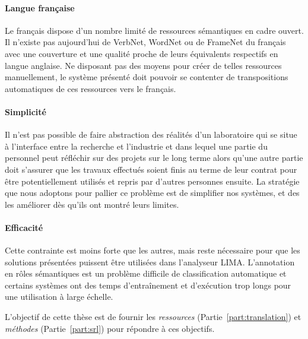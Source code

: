 \paragraph{Langue française} Le français dispose d'un nombre limité de
ressources sémantiques en cadre ouvert. Il n'existe pas aujourd'hui de VerbNet,
WordNet ou de FrameNet du français avec une couverture et une qualité proche de
leurs équivalents respectifs en langue anglaise. Ne disposant pas des moyens
pour créer de telles ressources manuellement, le système présenté doit pouvoir
se contenter de transpositions automatiques de ces ressources vers le français.

\paragraph{Simplicité} Il n'est pas possible de faire abstraction des réalités
d'un laboratoire qui se situe à l'interface entre la recherche et l'industrie
et dans lequel une partie du personnel peut réfléchir sur des projets sur le
long terme alors qu'une autre partie doit s'assurer que les travaux effectués
soient finis au terme de leur contrat pour être potentiellement utilisés et
repris par d'autres personnes ensuite. La stratégie que nous adoptons pour
pallier ce problème est de simplifier nos systèmes, et des les améliorer dès
qu'ils ont montré leurs limites.

\paragraph{Efficacité} Cette contrainte est moins forte que les autres, mais
reste nécessaire pour que les solutions présentées puissent être utilisées dans
l'analyseur LIMA. L'annotation en rôles sémantiques est un problème difficile
de classification automatique et certains systèmes ont des temps d'entraînement
et d'exécution trop longs pour une utilisation à large échelle.

L'objectif de cette thèse est de fournir les \emph{ressources}
(Partie~\ref{part:translation}) et \emph{méthodes} (Partie~\ref{part:srl})
pour répondre à ces objectifs.
